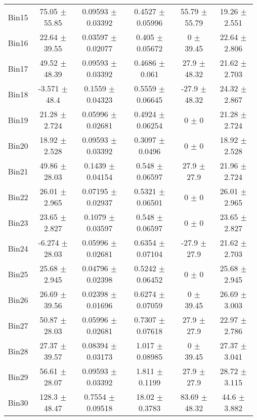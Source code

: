 \begin{tabular}{@{\extracolsep{4pt}}lccccc@{}}
     Bin15 & 75.05 $\pm$ 55.85 & 0.09593 $\pm$ 0.03392 & 0.4527 $\pm$ 0.05996 & 55.79 $\pm$ 55.79 & 19.26 $\pm$ 2.551 \\ 
     Bin16 & 22.64 $\pm$ 39.55 & 0.03597 $\pm$ 0.02077 & 0.405 $\pm$ 0.05672 & 0 $\pm$ 39.45 & 22.64 $\pm$ 2.806 \\ 
     Bin17 & 49.52 $\pm$ 48.39 & 0.09593 $\pm$ 0.03392 & 0.4686 $\pm$ 0.061 & 27.9 $\pm$ 48.32 & 21.62 $\pm$ 2.703 \\ 
     Bin18 & -3.571 $\pm$ 48.4 & 0.1559 $\pm$ 0.04323 & 0.5559 $\pm$ 0.06645 & -27.9 $\pm$ 48.32 & 24.32 $\pm$ 2.867 \\ 
     Bin19 & 21.28 $\pm$ 2.724 & 0.05996 $\pm$ 0.02681 & 0.4924 $\pm$ 0.06254 & 0 $\pm$ 0 & 21.28 $\pm$ 2.724 \\ 
     Bin20 & 18.92 $\pm$ 2.528 & 0.09593 $\pm$ 0.03392 & 0.3097 $\pm$ 0.0496 & 0 $\pm$ 0 & 18.92 $\pm$ 2.528 \\ 
     Bin21 & 49.86 $\pm$ 28.03 & 0.1439 $\pm$ 0.04154 & 0.548 $\pm$ 0.06597 & 27.9 $\pm$ 27.9 & 21.96 $\pm$ 2.724 \\ 
     Bin22 & 26.01 $\pm$ 2.965 & 0.07195 $\pm$ 0.02937 & 0.5321 $\pm$ 0.06501 & 0 $\pm$ 0 & 26.01 $\pm$ 2.965 \\ 
     Bin23 & 23.65 $\pm$ 2.827 & 0.1079 $\pm$ 0.03597 & 0.548 $\pm$ 0.06597 & 0 $\pm$ 0 & 23.65 $\pm$ 2.827 \\ 
     Bin24 & -6.274 $\pm$ 28.03 & 0.05996 $\pm$ 0.02681 & 0.6354 $\pm$ 0.07104 & -27.9 $\pm$ 27.9 & 21.62 $\pm$ 2.703 \\ 
     Bin25 & 25.68 $\pm$ 2.945 & 0.04796 $\pm$ 0.02398 & 0.5242 $\pm$ 0.06452 & 0 $\pm$ 0 & 25.68 $\pm$ 2.945 \\ 
     Bin26 & 26.69 $\pm$ 39.56 & 0.02398 $\pm$ 0.01696 & 0.6274 $\pm$ 0.07059 & 0 $\pm$ 39.45 & 26.69 $\pm$ 3.003 \\ 
     Bin27 & 50.87 $\pm$ 28.03 & 0.05996 $\pm$ 0.02681 & 0.7307 $\pm$ 0.07618 & 27.9 $\pm$ 27.9 & 22.97 $\pm$ 2.786 \\ 
     Bin28 & 27.37 $\pm$ 39.57 & 0.08394 $\pm$ 0.03173 & 1.017 $\pm$ 0.08985 & 0 $\pm$ 39.45 & 27.37 $\pm$ 3.041 \\ 
     Bin29 & 56.61 $\pm$ 28.07 & 0.09593 $\pm$ 0.03392 & 1.811 $\pm$ 0.1199 & 27.9 $\pm$ 27.9 & 28.72 $\pm$ 3.115 \\ 
     Bin30 & 128.3 $\pm$ 48.47 & 0.7554 $\pm$ 0.09518 & 18.02 $\pm$ 0.3783 & 83.69 $\pm$ 48.32 & 44.6 $\pm$ 3.882 \\ 
\hline\hline
  \end{tabular}

